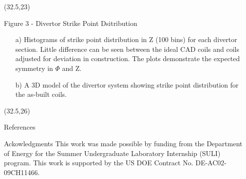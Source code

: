 \documentclass{beamer}
\begin{document}
\begin{frame}[t]
\begin{textblock}{15}(32.5,23)
\begin{block}{Figure 3 - Divertor Strike Point Dsitribution}
\begin{itemize}
\item[a)]Histograms of strike point distribution in Z (100 bins) for each divertor section.
Little difference can be seen between the ideal CAD coils and coils adjusted for deviation in construction.
The plots demonstrate the expected symmetry in $\Phi$ and Z.
\item[b)]A 3D model of the divertor system showing strike point distribution for the as-built coils.
\end{itemize}
\end{block}
\end{textblock}


\begin{textblock}{15}(32.5,26)
\begin{block}{References}
\nocite{lazerson}

\end{block}
\begin{block}{Ackowledgments}
This work was made possible by funding from the Department of Energy for the Summer Undergraduate Laboratory Internship (SULI) program. This work is supported by the US DOE Contract No. DE-AC02-09CH11466.
\end{block}
\end{textblock}
\end{frame}
\end{document}
